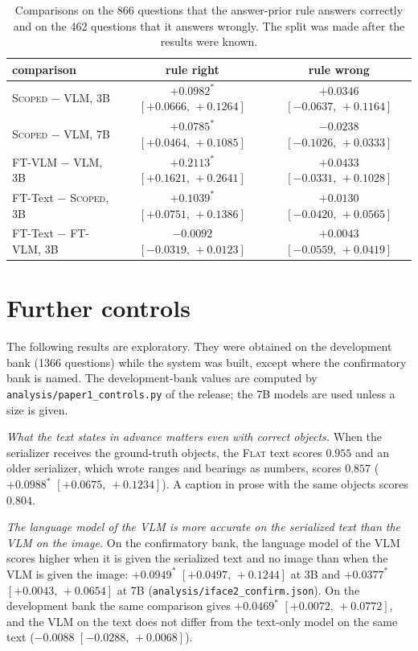\documentclass[10pt]{article}
\renewcommand{\thetable}{S\arabic{table}}
\newcommand{\fixtab}[1]{\renewcommand{\thetable}{#1}}
\begin{document}
\fixtab{S2c}\begin{table}[h]\centering\footnotesize
\caption{Comparisons on the 866 questions that the answer-prior rule answers correctly and on the 462 questions that it answers wrongly. The split was made after the results were known.}\label{tab:s2c}
\begin{tabular}{@{}lcc@{}}
\toprule comparison & rule right & rule wrong \\ \midrule
\textsc{Scoped} $-$ VLM, 3B & $+0.0982^{*}$ $[+0.0666,\,+0.1264]$ & $+0.0346$ $[-0.0637,\,+0.1164]$ \\
\textsc{Scoped} $-$ VLM, 7B & $+0.0785^{*}$ $[+0.0464,\,+0.1085]$ & $-0.0238$ $[-0.1026,\,+0.0333]$ \\
FT-VLM $-$ VLM, 3B & $+0.2113^{*}$ $[+0.1621,\,+0.2641]$ & $+0.0433$ $[-0.0331,\,+0.1028]$ \\
FT-Text $-$ \textsc{Scoped}, 3B & $+0.1039^{*}$ $[+0.0751,\,+0.1386]$ & $+0.0130$ $[-0.0420,\,+0.0565]$ \\
FT-Text $-$ FT-VLM, 3B & $-0.0092$ $[-0.0319,\,+0.0123]$ & $+0.0043$ $[-0.0559,\,+0.0419]$ \\
\bottomrule
\end{tabular}
\end{table}

\section{Further controls}
The following results are exploratory. They were obtained on the development bank (1366 questions) while the system was built, except where the confirmatory bank is named. The development-bank values are computed by \texttt{analysis/paper1\_controls.py} of the release; the 7B models are used unless a size is given.

\emph{What the text states in advance matters even with correct objects.} When the serializer receives the ground-truth objects, the \textsc{Flat} text scores $0.955$ and an older serializer, which wrote ranges and bearings as numbers, scores $0.857$ ($+0.0988^{*}$ $[+0.0675,\,+0.1234]$). A caption in prose with the same objects scores $0.804$.

\emph{The language model of the VLM is more accurate on the serialized text than the VLM on the image.} On the confirmatory bank, the language model of the VLM scores higher when it is given the serialized text and no image than when the VLM is given the image: $+0.0949^{*}$ $[+0.0497,\,+0.1244]$ at 3B and $+0.0377^{*}$ $[+0.0043,\,+0.0654]$ at 7B (\texttt{analysis/iface2\_confirm.json}). On the development bank the same comparison gives $+0.0469^{*}$ $[+0.0072,\,+0.0772]$, and the VLM on the text does not differ from the text-only model on the same text ($-0.0088$ $[-0.0288,\,+0.0068]$).
\end{document}
